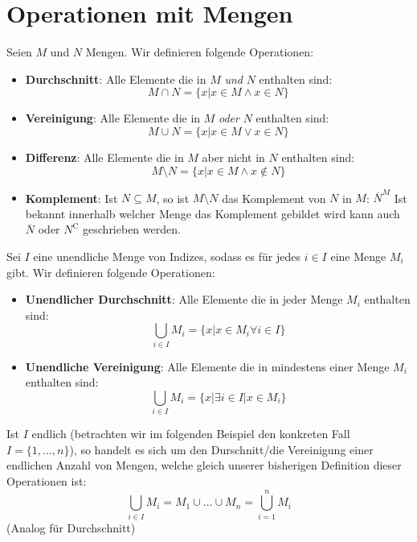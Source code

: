 \documentclass[../../main.tex]{subfiles}
\begin{document}
	
	
	\section{Operationen mit Mengen}

	\begin{definition}
		Seien $M$ und $N$ Mengen. Wir definieren folgende Operationen: 
		\begin{itemize}
			\item \textbf{Durchschnitt}: Alle Elemente die in $M$ \textit{und} $N$ enthalten sind: $$M \cap N = \{x | x \in M \land x \in N\}$$
			\item \textbf{Vereinigung}: Alle Elemente die in $M$ \textit{oder} $N$ enthalten sind: $$M \cup N = \{x | x \in M \lor x \in N\}$$
			\item \textbf{Differenz}: Alle Elemente die in $M$ aber nicht in $N$ enthalten sind: $$M \setminus N = \{x | x \in M \land x \not \in N\}$$
			\item \textbf{Komplement}: Ist $N \subseteq M$, so ist $M \setminus N$ das Komplement von $N$ in $M$: $\overline{N}^M$ Ist bekannt innerhalb welcher Menge das Komplement gebildet wird kann auch $\overline{N}$ oder $N^\mathrm{C}$ geschrieben werden.
		\end{itemize}
	\end{definition}

	\begin{definition}
		Sei $I$ eine unendliche Menge von Indizes, sodass es für jedes $i \in I$ eine Menge $M_i$ gibt. Wir definieren folgende Operationen:
		\begin{itemize}
			\item \textbf{Unendlicher Durchschnitt}: Alle Elemente die in jeder Menge $M_i$ enthalten sind: $$\bigcup_{i \in I}M_i = \{x | x \in M_i \forall i \in I\}$$
			\item \textbf{Unendliche Vereinigung}: Alle Elemente die in mindestens einer Menge $M_i$ enthalten sind: $$\bigcup_{i \in I}M_i = \{x | \exists i \in I | x \in M_i\}$$
		\end{itemize}
		Ist $I$ endlich (betrachten wir im folgenden Beispiel den konkreten Fall $I=\{1,...,n\}$), so handelt es sich um den Durschnitt/die Vereinigung einer endlichen Anzahl von Mengen, welche gleich unserer bisherigen Definition dieser Operationen ist: $$\bigcup_{i \in I} M_i = M_1 \cup ... \cup M_n = \bigcup_{i = 1}^{n}M_i$$ (Analog für Durchschnitt)
	\end{definition}
\end{document}
